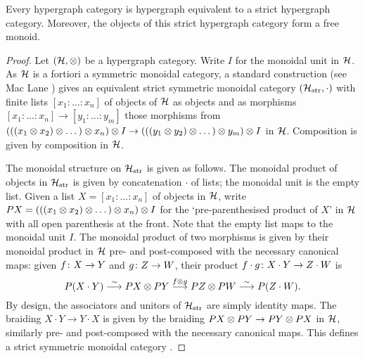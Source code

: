 \begin{theorem} \label{thm.stricthypergraphs}
  Every hypergraph category is hypergraph equivalent to a strict hypergraph
  category. Moreover, the objects of this strict hypergraph category form a free
  monoid.
\end{theorem}
\begin{proof}
  Let $(\mathcal H,\otimes)$ be a hypergraph category. Write $I$ for the monoidal unit in
  $\mathcal H$. As $\mathcal H$ is a fortiori a symmetric monoidal category, a standard
  construction (see Mac Lane \cite[Theorem XI.3.1]{Mac98}) gives an equivalent
  strict symmetric monoidal category $(\mathcal H_{\mathrm{str}}, \cdot)$ with
  finite lists $[x_1:\ldots:x_n]$ of objects of $\mathcal H$ as objects and as morphisms
  $[x_1:\ldots:x_n] \to [y_1:\ldots:y_m]$ those morphisms from $(((x_1 \otimes x_2)
  \otimes \dots) \otimes x_n) \otimes I \to (((y_1 \otimes y_2) \otimes \dots) \otimes y_m) \otimes I$ in $\mathcal H$.
  Composition is given by composition in $\mathcal H$.

  The monoidal structure on $\mathcal H_{\mathrm{str}}$ is given as follows. The
  monoidal product of objects in $\mathcal H_{\mathrm{str}}$ is given by
  concatenation $\cdot$ of lists; the monoidal unit is the empty list. Given a
  list $X = [x_1:\ldots: x_n]$ of objects in $\mathcal H$, write $PX = (((x_1 \otimes x_2)
  \otimes \dots) \otimes x_n) \otimes I$ for the `pre-parenthesised product of $X$' in $\mathcal H$ with
  all open parenthesis at the front.  Note that the empty list maps to the
  monoidal unit $I$. The monoidal product of two morphisms is
  given by their monoidal product in $\mathcal H$ pre- and post-composed with the
  necessary canonical maps: given $f{\colon} X \to Y$ and $g{\colon} Z \to W$, their
  product $f\cdot g{\colon} X\cdot Y \to Z \cdot W$ is 
  \[ 
    P(X \cdot Y) \stackrel{\sim}\longrightarrow PX \otimes PY \stackrel{f \otimes g}{\longrightarrow}
    PZ \otimes PW \stackrel{\sim}\longrightarrow P(Z \cdot W).  
  \] 
  By design, the associators and unitors of $\mathcal H_{\mathrm{str}}$ are simply
  identity maps. The braiding $X \cdot Y \to Y \cdot X$ is given by the braiding
  $PX \otimes PY \to PY \otimes PX$ in $\mathcal H$, similarly pre- and post-composed with
  the necessary canonical maps. This defines a strict symmetric monoidal
  category \cite{Mac98}.


\end{proof}
